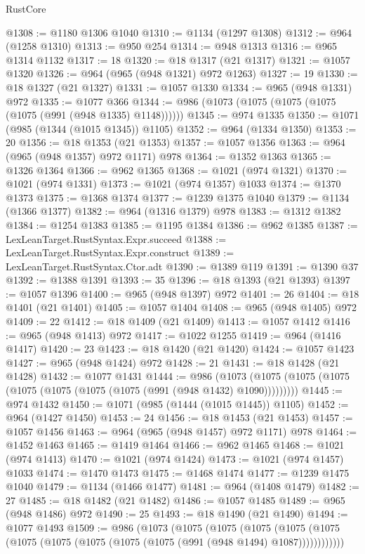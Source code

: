 \begin{lexlean}{RustCore}
\begin{coremodule}
@1308 := @1180 @1306 @1040
@1310 := @1134 (@1297 @1308)
@1312 := @964 (@1258 @1310)
@1313 := @950 @254
@1314 := @948 @1313
@1316 := @965 @1314 @1132
@1317 := 18
@1320 := @18 @1317 (@21 @1317)
@1321 := @1057 @1320
@1326 := @964 (@965 (@948 @1321) @972 @1263)
@1327 := 19
@1330 := @18 @1327 (@21 @1327)
@1331 := @1057 @1330
@1334 := @965 (@948 @1331) @972
@1335 := @1077 @366
@1344 := @986 (@1073 (@1075 (@1075 (@1075 (@1075 (@991 (@948 @1335) @1148))))))
@1345 := @974 @1335
@1350 := @1071 (@985 (@1344 (@1015 @1345)) @1105)
@1352 := @964 (@1334 @1350)
@1353 := 20
@1356 := @18 @1353 (@21 @1353)
@1357 := @1057 @1356
@1363 := @964 (@965 (@948 @1357) @972 @1171) @978
@1364 := @1352 @1363
@1365 := @1326 @1364
@1366 := @962 @1365
@1368 := @1021 (@974 @1321)
@1370 := @1021 (@974 @1331)
@1373 := @1021 (@974 @1357) @1033
@1374 := @1370 @1373
@1375 := @1368 @1374
@1377 := @1239 @1375 @1040
@1379 := @1134 (@1366 @1377)
@1382 := @964 (@1316 @1379) @978
@1383 := @1312 @1382
@1384 := @1254 @1383
@1385 := @1195 @1384
@1386 := @962 @1385
@1387 := LexLeanTarget.RustSyntax.Expr.succeed
@1388 := LexLeanTarget.RustSyntax.Expr.construct
@1389 := LexLeanTarget.RustSyntax.Ctor.adt
@1390 := @1389 @119
@1391 := @1390 @37
@1392 := @1388 @1391
@1393 := 35
@1396 := @18 @1393 (@21 @1393)
@1397 := @1057 @1396
@1400 := @965 (@948 @1397) @972
@1401 := 26
@1404 := @18 @1401 (@21 @1401)
@1405 := @1057 @1404
@1408 := @965 (@948 @1405) @972
@1409 := 22
@1412 := @18 @1409 (@21 @1409)
@1413 := @1057 @1412
@1416 := @965 (@948 @1413) @972
@1417 := @1022 @1255
@1419 := @964 (@1416 @1417)
@1420 := 23
@1423 := @18 @1420 (@21 @1420)
@1424 := @1057 @1423
@1427 := @965 (@948 @1424) @972
@1428 := 21
@1431 := @18 @1428 (@21 @1428)
@1432 := @1077 @1431
@1444 := @986
    (@1073 (@1075 (@1075 (@1075 (@1075 (@1075 (@1075 (@1075 (@991 (@948 @1432) @1090)))))))))
@1445 := @974 @1432
@1450 := @1071 (@985 (@1444 (@1015 @1445)) @1105)
@1452 := @964 (@1427 @1450)
@1453 := 24
@1456 := @18 @1453 (@21 @1453)
@1457 := @1057 @1456
@1463 := @964 (@965 (@948 @1457) @972 @1171) @978
@1464 := @1452 @1463
@1465 := @1419 @1464
@1466 := @962 @1465
@1468 := @1021 (@974 @1413)
@1470 := @1021 (@974 @1424)
@1473 := @1021 (@974 @1457) @1033
@1474 := @1470 @1473
@1475 := @1468 @1474
@1477 := @1239 @1475 @1040
@1479 := @1134 (@1466 @1477)
@1481 := @964 (@1408 @1479)
@1482 := 27
@1485 := @18 @1482 (@21 @1482)
@1486 := @1057 @1485
@1489 := @965 (@948 @1486) @972
@1490 := 25
@1493 := @18 @1490 (@21 @1490)
@1494 := @1077 @1493
@1509 := @986
    (@1073
      (@1075
        (@1075
          (@1075
            (@1075 (@1075 (@1075 (@1075 (@1075 (@1075 (@1075 (@991 (@948 @1494) @1087))))))))))))

\end{coremodule}
\end{lexlean}
